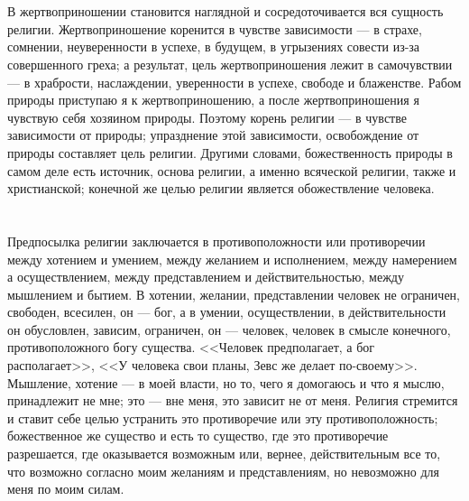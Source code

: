 \documentclass[12pt,oneside]{book}
\begin{document}
\chapter{}

В жертвоприношении становится наглядной и сосредоточивается вся сущность религии. Жертвоприношение коренится в чувстве зависимости --- в страхе, сомнении, неуверенности в успехе, в будущем, в угрызениях совести из-за совершенного греха; а результат, цель жертвоприношения лежит в самочувствии --- в храбрости, наслаждении, уверенности в успехе, свободе и блаженстве. Рабом природы приступаю я к жертвоприношению, а после жертвоприношения я чувствую себя хозяином природы. Поэтому корень религии --- в чувстве зависимости от природы; упразднение этой зависимости, освобождение от природы составляет цель религии. Другими словами, божественность природы в самом деле есть источник, основа религии, а именно всяческой религии, также и христианской; конечной же целью религии является обожествление человека.



\chapter{}

Предпосылка религии заключается в противоположности или противоречии между хотением и умением, между желанием и исполнением, между намерением а осуществлением, между представлением и действительностью, между мышлением и бытием. В хотении, желании, представлении человек не ограничен, свободен, всесилен, он --- бог, а в умении, осуществлении, в действительности он обусловлен, зависим, ограничен, он --- человек, человек в смысле конечного, противоположного богу существа. <<Человек предполагает, а бог располагает>>, <<У человека свои планы, Зевс же делает по-своему>>. Мышление, хотение --- в моей власти, но то, чего я домогаюсь и что я мыслю, принадлежит не мне; это --- вне меня, это зависит не от меня. Религия стремится и ставит себе целью устранить это противоречие или эту противоположность; божественное же существо и есть то существо, где это противоречие разрешается, где оказывается возможным или, вернее, действительным все то, что возможно согласно моим желаниям и представлениям, но невозможно для меня по моим силам.



\chapter{}
\end{document}
